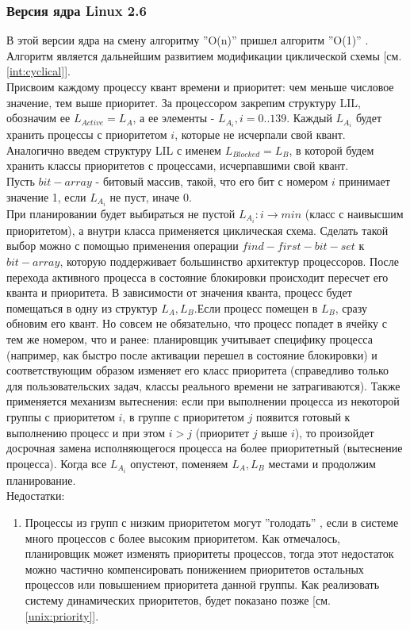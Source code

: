 \subsubsection{Версия ядра Linux 2.6}
В этой версии ядра на смену алгоритму ''O(n)'' пришел алгоритм ''O(1)'' \cite{ibmLinux}. Алгоритм является дальнейшим развитием модификации циклической схемы [см. \ref{int:cyclical}].\\
Присвоим каждому процессу квант времени и приоритет: чем меньше числовое значение, тем выше приоритет.
За процессором закрепим структуру LIL, обозначим ее $L_{Active} =  L_A$, а ее элементы - $L_{A_i}, i = 0..139$. Каждый $L_{A_i}$ будет хранить процессы с приоритетом $i$, которые не исчерпали свой квант. Аналогично введем структуру LIL с именем $L_{Blocked} = L_B$, в которой будем хранить классы приоритетов с процессами, исчерпавшими свой квант.\\

Пусть $bit-array$ - битовый массив, такой, что его бит с номером $i$ принимает значение 1, если  $L_{A_i}$ не пуст, иначе 0. \\
При планировании будет выбираться не пустой $L_{A_i}:i \rightarrow min$ (класс с наивысшим приоритетом), а внутри класса применяется циклическая схема. Сделать такой выбор можно с помощью применения операции $find-first-bit-set$ к $bit-array$, которую поддерживает большинство архитектур процессоров. После перехода активного процесса в состояние блокировки происходит пересчет его кванта и приоритета. В зависимости от значения кванта, процесс будет помещаться в одну из структур $L_{A}, L_B$.Если процесс помещен в $L_B$, сразу обновим его квант. Но совсем не обязательно, что процесс попадет в ячейку с тем же номером, что и ранее: планировщик учитывает специфику процесса (например, как быстро после активации перешел в состояние блокировки) и соответствующим образом изменяет его класс приоритета (справедливо только для пользовательских задач, классы реального времени не затрагиваются). Также применяется механизм вытеснения: если при выполнении процесса из некоторой группы с приоритетом $i$, в группе с приоритетом $j$ появится готовый к выполнению процесс и при этом $i > j$ (приоритет $j$ выше $i$), то произойдет досрочная замена исполняющегося процесса на более приоритетный (вытеснение процесса).
Когда все $L_{A_i}$ опустеют, поменяем $L_A, L_B$ местами и продолжим планирование.\\ 
Недостатки:
\begin{enumerate}[label=---]
\item Процессы из групп с низким приоритетом могут ''голодать'' , если в системе много процессов с более высоким приоритетом. Как отмечалось, планировщик может изменять приоритеты процессов, тогда этот недостаток можно частично компенсировать понижением приоритетов остальных процессов или повышением приоритета данной группы. Как реализовать систему динамических приоритетов, будет показано позже [см. \ref{unix:priority}].
\end{enumerate}

